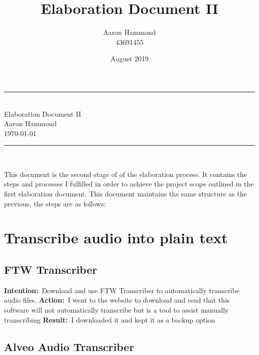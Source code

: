\documentclass{article}
\title{Elaboration Document II}
\author{Aaron Hammond\\43691455}
\date{August 2019}
\newcommand\HRule{\rule{\textwidth}{1pt}} %
\newcommand{\intention}[1]{\textbf{Intention:}{\textnormal\ #1} \newline}
\newcommand{\action}[1]{\textbf{Action:}{\textnormal\ #1} \newline}
\newcommand{\result}[1]{\textbf{Result:}{\textnormal\ #1} \newline}
\begin{document}

\begin{titlepage}


\begin{center}
\HRule\\[0.4cm]
\huge{Elaboration Document II}\\[0.5cm]
\huge{Aaron Hammond}\\
\large{\today}\\[0.4cm]

\HRule \\[1cm]
\end{center}

\begin{justify}
\noindent This document is the second stage of of the elaboration process. It contains the steps and processes I fulfilled in order to achieve the project scope outlined in the first elaboration document. This document maintains the same structure as the previous, the steps are as follows:
\end{justify}


\def\contentsname{\empty} %
\tableofcontents

\end{titlepage}


\section{Transcribe audio into plain text}

\subsection{FTW Transcriber}
\intention{Download and use FTW Transcriber to automatically transcribe audio files.}
\action{I went to the website to download and read that this software will not automatically transcribe but is a tool to assist manually transcribing}
\result{I downloaded it and kept it as a backup option}

\subsection{Alveo Audio Transcriber}
\end{document}
